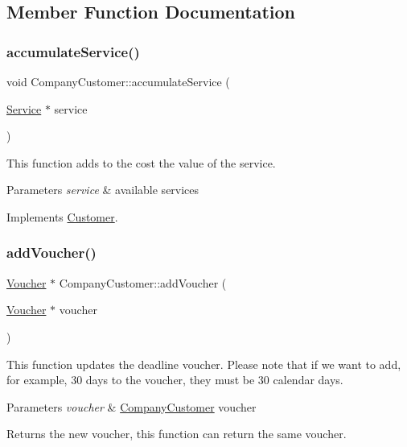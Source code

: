 \subsection{Member Function Documentation}
\hypertarget{classCompanyCustomer_a904197ef9475d4309ac41cc54a2ae5a3}{}\label{classCompanyCustomer_a904197ef9475d4309ac41cc54a2ae5a3} 
\subsubsection{\texorpdfstring{accumulate\+Service()}{accumulateService()}}
{\footnotesize\ttfamily void Company\+Customer\+::accumulate\+Service (\begin{DoxyParamCaption}\item[{\hyperlink{classService}{Service} $\ast$}]{service }\end{DoxyParamCaption})\hspace{0.3cm}{\ttfamily [virtual]}}

This function adds to the cost the value of the service. 
\begin{DoxyParams}{Parameters}
{\em service} & available services \\
\hline
\end{DoxyParams}


Implements \hyperlink{classCustomer_ab42320f3e4d1c23e745ce901d30faf77}{Customer}.

\hypertarget{classCompanyCustomer_a8cac3004028091378a2edb5cc211f1c8}{}\label{classCompanyCustomer_a8cac3004028091378a2edb5cc211f1c8} 
\subsubsection{\texorpdfstring{add\+Voucher()}{addVoucher()}}
{\footnotesize\ttfamily \hyperlink{classVoucher}{Voucher} $\ast$ Company\+Customer\+::add\+Voucher (\begin{DoxyParamCaption}\item[{\hyperlink{classVoucher}{Voucher} $\ast$}]{voucher }\end{DoxyParamCaption})}

This function updates the deadline voucher. Please note that if we want to add, for example, 30 days to the voucher, they must be 30 calendar days. 
\begin{DoxyParams}{Parameters}
{\em voucher} & \hyperlink{classCompanyCustomer}{Company\+Customer} voucher \\
\hline
\end{DoxyParams}
\begin{DoxyReturn}{Returns}
the new voucher, this function can return the same voucher. 
\end{DoxyReturn}
\hypertarget{classCompanyCustomer_a4552ae519d7ba549979d7f67cfdec3fb}{}\label{classCompanyCustomer_a4552ae519d7ba549979d7f67cfdec3fb} 
